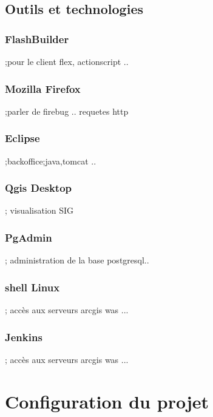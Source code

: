 \section{Outils et technologies}
\subsection{FlashBuilder} ;pour le client flex, actionscript ..
\subsection{Mozilla Firefox} ;parler de firebug .. requetes http
\subsection{Eclipse} ;backoffice;java,tomcat ..
\subsection{Qgis Desktop} ; visualisation SIG
\subsection{PgAdmin}; administration de la base postgresql..
\subsection{shell Linux}; accès aux serveurs arcgis was ...
\subsection{Jenkins}; accès aux serveurs arcgis was ...
\chapter{Configuration du projet}
